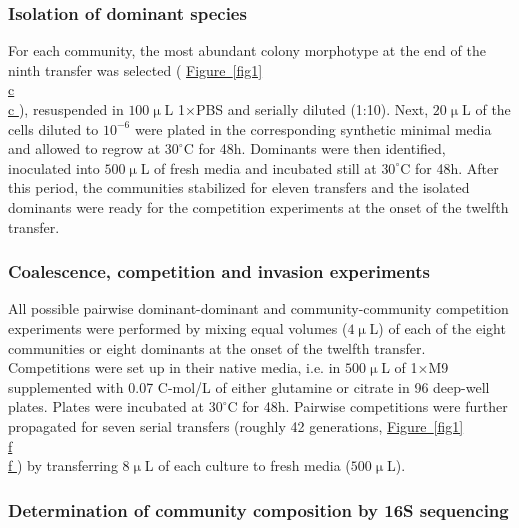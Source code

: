 \documentclass[a4paper,10pt]{article}
\newcommand{\figref}[2][]{%
  \hyperref[{#2}]{%
    Figure~\ref*{#2}%
    \ifx\\#1\\%
    \else
      #1%
    \fi
  }%
}
\begin{document}
\subsubsection*{Isolation of dominant species}\label{methods:dominants}

For each community, the most abundant colony morphotype at the end of the ninth transfer
was selected (\figref[c]{fig1}),
resuspended in $100\upmu$L 1$\times$PBS and serially diluted (1:10).
Next, $20\upmu$L of the cells diluted to $10^{-6}$ were plated in the corresponding synthetic
minimal media and allowed to regrow at $30^\circ$C for 48h. Dominants were then identified,
inoculated into $500\upmu$L of fresh media and incubated still at $30^\circ$C for 48h.
After this period, the communities stabilized for eleven transfers and the isolated dominants
were ready for the competition experiments at the onset of the twelfth transfer.

\subsubsection*{Coalescence, competition and invasion experiments}
\label{methods:competitions}

All possible pairwise dominant-dominant and community-community
competition experiments
were performed by mixing equal volumes ($4\upmu$L) of each of the eight
communities or eight dominants at the onset of the twelfth transfer.
Competitions were set up in their native media,
i.e. in $500\upmu$L of 1$\times$M9 supplemented with 0.07 C-mol/L of
either glutamine or citrate in 96 deep-well plates.
Plates were incubated at $30^\circ$C for 48h.
Pairwise competitions were further propagated for seven serial transfers
(roughly 42 generations, \figref[f]{fig1}) by transferring $8\upmu$L of
each culture to fresh media ($500\upmu$L).

\subsubsection*{Determination of community composition by 16S sequencing}
\label{methods:sequencing}
\end{document}
